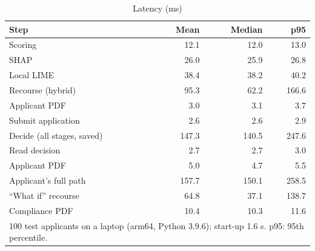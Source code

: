 \begin{table}[t]
\caption{Latency (ms)}
\label{tab:latency}
\centering
\setlength{\tabcolsep}{4pt}
\begin{tabular}{lrrr}
\hline
\textbf{Step} & \textbf{Mean} & \textbf{Median} & \textbf{p95} \\
\hline
Scoring & 12.1 & 12.0 & 13.0 \\
SHAP & 26.0 & 25.9 & 26.8 \\
Local LIME & 38.4 & 38.2 & 40.2 \\
Recourse (hybrid) & 95.3 & 62.2 & 166.6 \\
Applicant PDF & 3.0 & 3.1 & 3.7 \\
\hline
Submit application & 2.6 & 2.6 & 2.9 \\
Decide (all stages, saved) & 147.3 & 140.5 & 247.6 \\
Read decision & 2.7 & 2.7 & 3.0 \\
Applicant PDF & 5.0 & 4.7 & 5.5 \\
Applicant's full path & 157.7 & 150.1 & 258.5 \\
``What if'' recourse & 64.8 & 37.1 & 138.7 \\
Compliance PDF & 10.4 & 10.3 & 11.6 \\
\hline
\multicolumn{4}{p{0.92\linewidth}}{\footnotesize 100 test applicants on a laptop (arm64, Python 3.9.6); start-up 1.6 s. p95: 95th percentile.} \\
\end{tabular}
\end{table}
